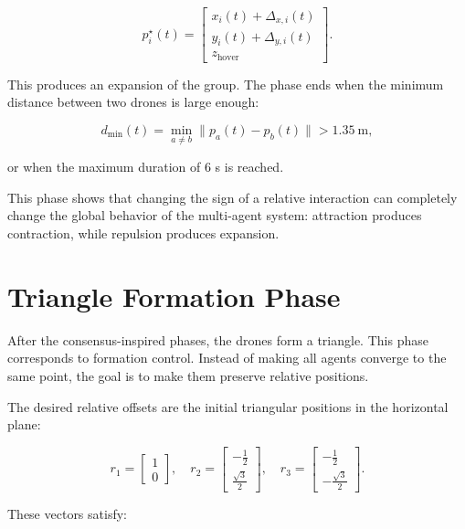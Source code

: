 \begin{equation}
    p_i^{\star}(t)=
    \begin{bmatrix}
    x_i(t)+\Delta_{x,i}(t) \\
    y_i(t)+\Delta_{y,i}(t) \\
    z_{\text{hover}}
    \end{bmatrix}.
\end{equation}

This produces an expansion of the group. The phase ends when the minimum distance between two drones is large enough:

\begin{equation}
    d_{\min}(t)=\min_{a\neq b}\|p_a(t)-p_b(t)\|>1.35 \ \text{m},
\end{equation}

or when the maximum duration of $6$ s is reached.

This phase shows that changing the sign of a relative interaction can completely change the global behavior of the multi-agent system: attraction produces contraction, while repulsion produces expansion.

\section{Triangle Formation Phase}

After the consensus-inspired phases, the drones form a triangle. This phase corresponds to formation control. Instead of making all agents converge to the same point, the goal is to make them preserve relative positions.

The desired relative offsets are the initial triangular positions in the horizontal plane:

\begin{equation}
    r_1=
    \begin{bmatrix}
    1 \\
    0
    \end{bmatrix}, \quad
    r_2=
    \begin{bmatrix}
    -\frac{1}{2} \\
    \frac{\sqrt{3}}{2}
    \end{bmatrix}, \quad
    r_3=
    \begin{bmatrix}
    -\frac{1}{2} \\
    -\frac{\sqrt{3}}{2}
    \end{bmatrix}.
\end{equation}

These vectors satisfy:


